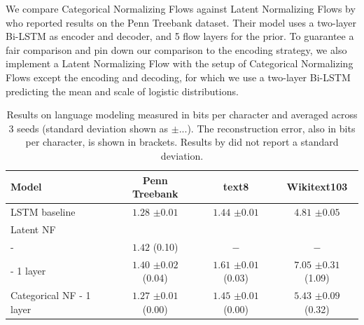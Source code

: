 We compare Categorical Normalizing Flows against Latent Normalizing Flows by \citet{SemiDiscreteNFSequence} who reported results on the Penn Treebank dataset.
Their model uses a two-layer Bi-LSTM as encoder and decoder, and 5 flow layers for the prior.
To guarantee a fair comparison and pin down our comparison to the encoding strategy, we also implement a Latent Normalizing Flow with the setup of Categorical Normalizing Flows except the encoding and decoding, for which we use a two-layer Bi-LSTM predicting the mean and scale of logistic distributions.

\begin{table}[t]
	\caption[Results on language modeling]{Results on language modeling measured in bits per character and averaged across 3 seeds (standard deviation shown as $\pm...$). The reconstruction error, also in bits per character, is shown in brackets. Results by \citet{SemiDiscreteNFSequence} did not report a standard deviation.
	}
	\label{tab:result_table_token_level}
	\centering
	\setlength\tabcolsep{4mm}
	\begin{tabular}{lccc}
		\toprule
		\textbf{Model} & \textbf{Penn Treebank} & \textbf{text8} & \textbf{Wikitext103} \\
		\midrule
		LSTM baseline & $1.28$ \footnotesize{$\pm0.01$} & $1.44$ \footnotesize{$\pm0.01$} & $4.81$ \footnotesize{$\pm0.05$}\\[4pt]
		Latent NF & & & \\
		- \citet{SemiDiscreteNFSequence} & $1.42$ \footnotesize{(0.10)} & $-$ & $-$ \\
		- 1 layer & $1.40$ \footnotesize{$\pm0.02$} \footnotesize{(0.04)} & $1.61$ \footnotesize{$\pm0.01$} \footnotesize{(0.03)} & $7.05$ \footnotesize{$\pm0.31$} \footnotesize{(1.09)}\\
		\midrule
		Categorical NF - 1 layer & $1.27$ \footnotesize{$\pm0.01$} \footnotesize{(0.00)} & $1.45$ \footnotesize{$\pm0.01$} \footnotesize{(0.00)} & $5.43$ \footnotesize{$\pm0.09$} \footnotesize{(0.32)}\\
		\bottomrule
	\end{tabular}
\end{table}

